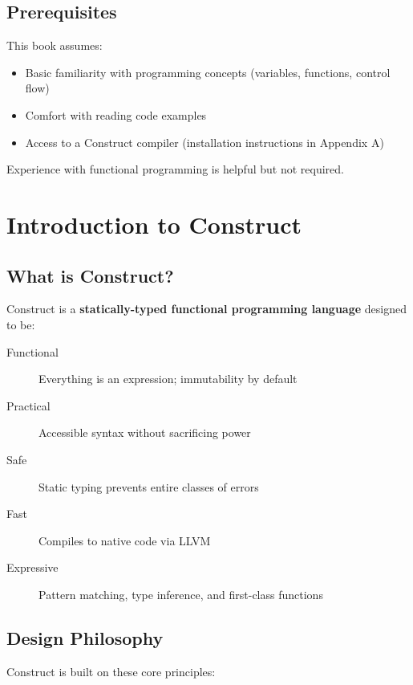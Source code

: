 \documentclass[11pt,twoside,openright]{book}
\begin{document}
\section*{Prerequisites}

This book assumes:

\begin{itemize}
    \item Basic familiarity with programming concepts (variables, functions, control flow)
    \item Comfort with reading code examples
    \item Access to a Construct compiler (installation instructions in Appendix A)
\end{itemize}

Experience with functional programming is helpful but not required.

\newpage
\tableofcontents

\mainmatter

\chapter{Introduction to Construct}

\section{What is Construct?}

Construct is a \textbf{statically-typed functional programming language} designed to be:

\begin{description}
    \item[Functional] Everything is an expression; immutability by default
    \item[Practical] Accessible syntax without sacrificing power
    \item[Safe] Static typing prevents entire classes of errors
    \item[Fast] Compiles to native code via LLVM
    \item[Expressive] Pattern matching, type inference, and first-class functions
\end{description}

\section{Design Philosophy}

Construct is built on these core principles:
\end{document}
